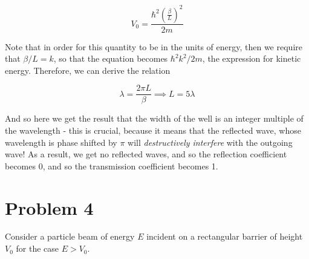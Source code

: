 \documentclass[10pt]{article}
\begin{document}
\begin{enumerate}[(a)]
\begin{solution}
            \[ V_0 = \frac{\hbar^2 \left(\frac{\beta}L\right)^2}{2m}\] 

            Note that in order for this quantity to be in the units of energy, then we require that $\beta/L = k$, so that the equation becomes $\hbar^2k^2/2m$, the expression for kinetic energy. Therefore, we can derive the relation

            \[ \lambda = \frac{2\pi L}{\beta} \implies L = 5\lambda\] 

            And so here we get the result that the width of the well is an integer multiple of the wavelength - this is crucial, because it means that the reflected wave, whose wavelength is phase shifted by $\pi$ will \textit{destructively interfere} with the outgoing wave! As a result, we get no reflected waves, and so the reflection coefficient becomes 0, and so the transmission coefficient becomes 1. 
        \end{solution}
    \end{enumerate}


    \pagebreak 

    \section*{Problem 4}

    Consider a particle beam of energy $E$ incident on a rectangular barrier of height $V_0$ for the case $E > V_0$. 

    
    \begin{center}
    \end{center}
\end{document}
